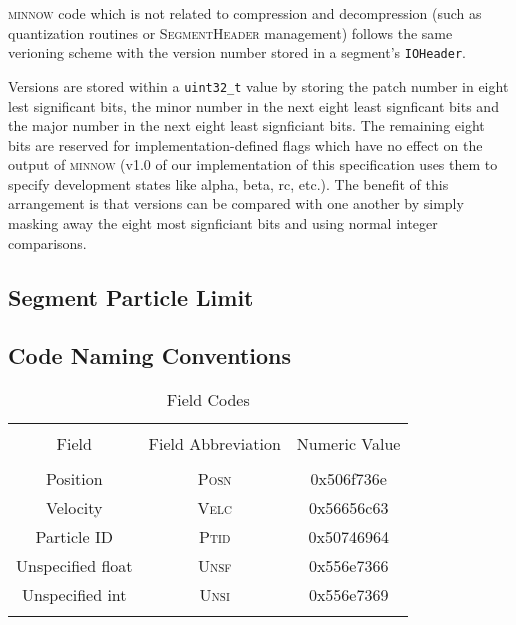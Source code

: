 \documentclass[numberedappendix,apj]{emulateapj}
\begin{document}
\textsc{minnow} code which is not related to compression and decompression
(such as quantization routines or \textsc{SegmentHeader} management) follows
the same verioning scheme with the version number stored in a segment's 
\texttt{IOHeader}.

Versions are stored within a \texttt{uint32\_t} value by storing the patch
number in eight lest significant bits, the minor number in the next eight least
signficant bits and the major number in the next eight least signficiant
bits. The remaining eight bits are reserved for implementation-defined flags
which have no effect on the output of \textsc{minnow} (v1.0 of our
implementation of this specification uses them to specify development states
like alpha, beta, rc, etc.). The benefit of this arrangement is that versions
can be compared with one another by simply masking away the eight most
signficiant bits and using normal integer comparisons.

\subsection{Segment Particle Limit}
\label{sec:particle_limit}

\subsection{Code Naming Conventions}
\label{sec:coding_conventions}

\begin{table}
   \centering
   \caption{Field Codes}
   \label{tab:field_codes}
   \begin{tabular}{ccc}
   \hline
   \hline       
   \\
   Field & Field Abbreviation & Numeric Value
   \\
   \hline
   \\
   Position & \textsc{Posn} & 0x506f736e \\
   Velocity & \textsc{Velc} & 0x56656c63 \\
   Particle ID & \textsc{Ptid} & 0x50746964 \\
   Unspecified float & \textsc{Unsf} & 0x556e7366 \\
   Unspecified int & \textsc{Unsi} & 0x556e7369
   \\
   \hline
   \\
   \end{tabular}
\end{table}
\end{document}
